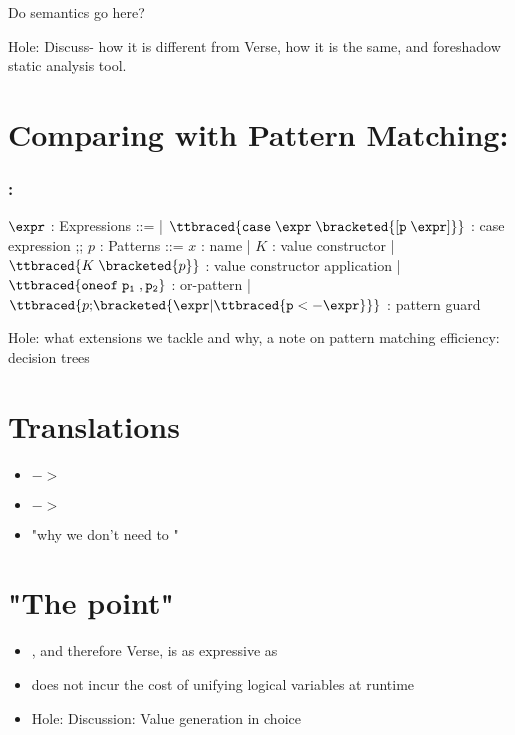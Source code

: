\documentclass[]{article}
\begin{document}
    Do semantics go here? 

    Hole: Discuss- how it is different from Verse, how it is the same, and
    foreshadow static analysis tool. 
\section{Comparing with Pattern Matching: \Pplus}

\subsubsection{\Pplus:}
\begin{center}
    \begin{bnf}
$\expr$ : \textsf{Expressions} ::=
    | $\ttbraced{\tt{case} \; \expr \; \bracketed{\tt{[} p \; \expr \tt{]}}}$ : case expression 
    ;;
    $p$ : \textsf{Patterns} ::= $x$ : name 
    | $K$ : value constructor 
    | $\ttbraced{K \; \bracketed{p}}$ : value constructor application 
    | $\ttbraced{\tt{oneof} \; p_{1} \;, p_{2} }$ : or-pattern 
    | $\ttbraced{p \tt{;} \bracketed{\expr \vert \ttbraced{p  <- \expr}}}$ : pattern guard
    \end{bnf}
\end{center}
    Hole: what extensions we tackle and why, a note on pattern matching
     efficiency: decision trees

\section{Translations}

\begin{itemize}
    \item \Pplus $->$ \VMinus 
    \item \VMinus $->$ \D
    \item "why we don't need \Pplus to \D"
\end{itemize}

\section{"The point"}


\begin{itemize}
    \item \VMinus, and therefore Verse, is as expressive as \Pplus
    \item \VMinus does not incur the cost of unifying logical variables at runtime 
    \item Hole: Discussion: Value generation in choice 
\end{itemize}
\end{document}
